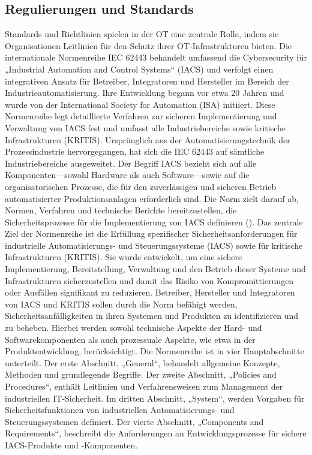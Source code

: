 \subsection{Regulierungen und Standards}
Standards und Richtlinien spielen in der OT eine zentrale Rolle, indem sie Organisationen Leitlinien für den Schutz ihrer OT-Infrastrukturen bieten. Die internationale Normenreihe IEC 62443 behandelt umfassend die Cybersecurity für „Industrial Automation and Control Systems“ (IACS) und verfolgt einen integrativen Ansatz für Betreiber, Integratoren und Hersteller im Bereich der Industrieautomatisierung. Ihre Entwicklung begann vor etwa 20 Jahren und wurde von der International Society for Automation (ISA) initiiert. Diese Normenreihe legt detaillierte Verfahren zur sicheren Implementierung und Verwaltung von IACS fest und umfasst alle Industriebereiche sowie kritische Infrastrukturen (KRITIS). Ursprünglich aus der Automatisierungstechnik der Prozessindustrie hervorgegangen, hat sich die IEC 62443 auf sämtliche Industriebereiche ausgeweitet. Der Begriff IACS bezieht sich auf alle Komponenten—sowohl Hardware als auch Software—sowie auf die organisatorischen Prozesse, die für den zuverlässigen und sicheren Betrieb automatisierter Produktionsanlagen erforderlich sind. Die Norm zielt darauf ab, Normen, Verfahren und technische Berichte bereitzustellen, die Sicherheitsprozesse für die Implementierung von IACS definieren (\cite{DKE}). Das zentrale Ziel der Normenreihe ist die Erfüllung spezifischer Sicherheitsanforderungen für industrielle Automatisierungs- und Steuerungssysteme (IACS) sowie für kritische Infrastrukturen (KRITIS). Sie wurde entwickelt, um eine sichere Implementierung, Bereitstellung, Verwaltung und den Betrieb dieser Systeme und Infrastrukturen sicherzustellen und damit das Risiko von Kompromittierungen oder Ausfällen signifikant zu reduzieren. Betreiber, Hersteller und Integratoren von IACS und KRITIS sollen durch die Norm befähigt werden, Sicherheitsanfälligkeiten in ihren Systemen und Produkten zu identifizieren und zu beheben. Hierbei werden sowohl technische Aspekte der Hard- und Softwarekomponenten als auch prozessuale Aspekte, wie etwa in der Produktentwicklung, berücksichtigt.
Die Normenreihe ist in vier Hauptabschnitte unterteilt. Der erste Abschnitt, „General“, behandelt allgemeine Konzepte, Methoden und grundlegende Begriffe. Der zweite Abschnitt, „Policies and Procedures“, enthält Leitlinien und Verfahrensweisen zum Management der industriellen IT-Sicherheit. Im dritten Abschnitt, „System“, werden Vorgaben für Sicherheitsfunktionen von industriellen Automatisierungs- und Steuerungssystemen definiert. Der vierte Abschnitt, „Components and Requirements“, beschreibt die Anforderungen an Entwicklungsprozesse für sichere IACS-Produkte und -Komponenten.
